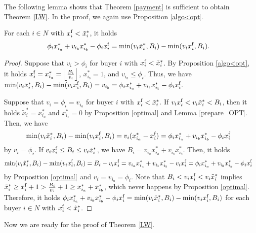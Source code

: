 \documentclass[letterpaper,11pt]{article}
\begin{document}
	The following lemma shows that Theorem \ref{payment} is sufficient to obtain Theorem \ref{LW}.
	In the proof, we again use Proposition \ref{algo<opt}.
	
	\begin{lemma}
	\label{prepare_LW}
	For each $i\in N$ with $x^{\rm f}_i< \tilde{x}^*_i$, it holds 
	\[
	\phi_{i}x_{i_{a}}^*+v_{i_{b}}x_{i_{b}}^*-\phi_{i}x^{\rm f}_{i}= \min(v_i \tilde{x}^{*}_i, B_i)-\min(v_i x^{\rm f}_i, B_i).
	\]
	\end{lemma}
	\begin{proof}
	Suppose that $v_i>\phi_i$ for buyer $i$ with $x^{\rm f}_i< \tilde{x}^*_i$.
	By Proposition \ref{algo<opt}, it holds 
	$x^{\rm f}_i=x^*_{i_{a}}=\left\lfloor \frac{B_i}{v_i}\right\rfloor$, $x^*_{i_{b}}=1$, and $v_{i_{b}}\leq \phi_i$. 
	Thus, we have 
	$\min(v_i \tilde{x}^{*}_i, B_i)-\min(v_i x^{\rm f}_i, B_i)=v_{i_{b}}=
	\phi_{i}x_{i_{a}}^*+v_{i_{b}}x_{i_{b}}^*-\phi_{i}x^{\rm f}_{i}.$
	
	Suppose that $v_i=\phi_i=v_{i_a}$ for buyer $i$ with $x^{\rm f}_i< \tilde{x}^*_i$.
	If $v_i x^{\rm f}_i <v_i \tilde{x}^{*}_i< B_i$, then it holds $\tilde{x}^{*}_i=x^{*}_{i_a}$ and $x^{*}_{i_b}=0$ 
	by Proposition \ref{optimal} and Lemma \ref{prepare_OPT}. Then, we have 
	\[
	\min(v_i \tilde{x}^{*}_i, B_i)-\min(v_i x^{\rm f}_i, B_i)=v_i (x^{*}_{i_a}-x^{\rm f}_i)
	= \phi_{i}x_{i_{a}}^*+v_{i_{b}}x_{i_{b}}^*-\phi_{i}x^{\rm f}_{i}
	\]
	 by $v_i=\phi_i$.
	If $v_i x^{\rm f}_i\leq B_i \leq v_i \tilde{x}^{*}_i$, we have $B_i=v_{i_a}x_{i_{a}}^*+v_{i_{b}}x_{i_{b}}^*$.
	Then, it holds 
	\[
	\min(v_i \tilde{x}^{*}_i, B_i)-\min(v_i x^{\rm f}_i, B_i)=B_i-v_i x^{\rm f}_i
	=v_{i_a}x_{i_{a}}^*+v_{i_{b}}x_{i_{b}}^*-v_i x^{\rm f}_{i}
	=\phi_{i}x_{i_{a}}^*+v_{i_{b}}x_{i_{b}}^*-\phi_{i}x^{\rm f}_{i}
	\]
	by Proposition \ref{optimal} and $v_i=v_{i_a}=\phi_i$.
	Note that $B_i<v_i x^{\rm f}_i <v_i \tilde{x}^{*}_i$ implies 
	$\tilde{x}^{*}_i\geq x^{\rm f}_i+1>\frac{B_i}{v_i}+1\geq x^{*}_{i_a}+x^{*}_{i_b}$, 
	which never happens by Proposition \ref{optimal}.
	Therefore, it holds 
	$\phi_{i}x_{i_{a}}^*+v_{i_{b}}x_{i_{b}}^*-\phi_{i}x^{\rm f}_{i}
	=\min(v_i \tilde{x}^{*}_i, B_i)-\min(v_i x^{\rm f}_i, B_i)$ 
	for each buyer $i\in N$ with $x^{\rm f}_i< \tilde{x}^*_i$.
	\end{proof}
	
	
	Now we are ready for the proof of Theorem \ref{LW}.
\end{document}
